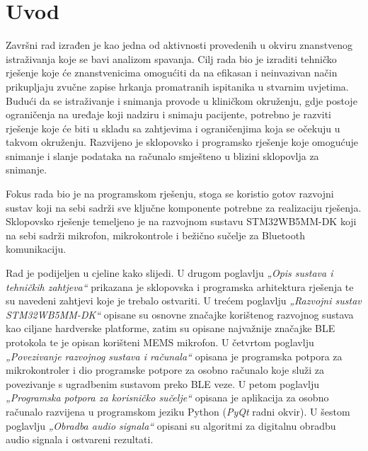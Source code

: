 \chapter{Uvod}

Završni rad izrađen je kao jedna od aktivnosti provedenih u okviru znanstvenog istraživanja koje se bavi analizom spavanja. Cilj rada bio je izraditi tehničko rješenje koje će znanstvenicima omogućiti da na efikasan i neinvazivan način prikupljaju zvučne zapise hrkanja promatranih ispitanika u stvarnim uvjetima. Budući da se istraživanje i snimanja provode u kliničkom okruženju, gdje postoje ograničenja na uređaje koji nadziru i snimaju pacijente, potrebno je razviti rješenje koje će biti u skladu sa zahtjevima i ograničenjima koja se očekuju u takvom okruženju. Razvijeno je sklopovsko i programsko rješenje koje omogućuje snimanje i slanje podataka na računalo smješteno u blizini sklopovlja za snimanje.

Fokus rada bio je na programskom rješenju, stoga se koristio gotov razvojni sustav koji na sebi sadrži sve ključne komponente potrebne za realizaciju rješenja. Sklopovsko rješenje temeljeno je na razvojnom sustavu STM32WB5MM-DK koji na sebi sadrži mikrofon, mikrokontrole i bežično sučelje za Bluetooth komunikaciju.

Rad je podijeljen u cjeline kako slijedi.
U drugom poglavlju \textit{„Opis sustava i tehničkih zahtjeva“} prikazana je sklopovska i programska arhitektura rješenja te su navedeni zahtjevi koje je trebalo ostvariti. U trećem poglavlju \textit{„Razvojni sustav STM32WB5MM-DK“} opisane su osnovne značajke korištenog razvojnog sustava kao ciljane hardverske platforme, zatim su opisane najvažnije značajke BLE protokola te je opisan korišteni MEMS mikrofon. U četvrtom poglavlju \textit{„Povezivanje razvojnog sustava i računala“} opisana je programska potpora za mikrokontroler i dio programske potpore za osobno računalo koje služi za povezivanje s ugradbenim sustavom preko BLE veze. U petom poglavlju \textit{„Programska potpora za korisničko sučelje“} opisana je aplikacija za osobno računalo razvijena u programskom jeziku Python (\textit{PyQt} radni okvir). U šestom poglavlju \textit{„Obradba audio signala“} opisani su algoritmi za digitalnu obradbu audio signala i ostvareni rezultati.



\eject